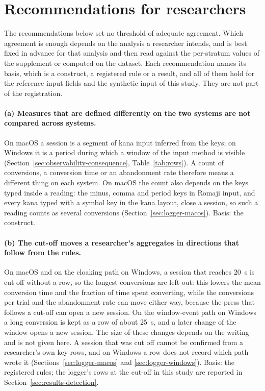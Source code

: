 
\section{Recommendations for researchers}
\label{sec:recommendations}

The recommendations below set no threshold of adequate agreement. Which agreement is enough depends on the analysis a
researcher intends, and is best fixed in advance for that analysis and then read against the per-stratum values of the
supplement or computed on the dataset. Each recommendation names its basis, which is a construct, a registered rule or
a result, and all of them hold for the reference input fields and the synthetic input of this study. They are not part
of the registration.

\paragraph{(a) Measures that are defined differently on the two systems are not compared across systems.} On macOS a
session is a segment of kana input inferred from the keys; on Windows it is a period during which a window of the input
method is visible (Section~\ref{sec:observability-consequence}, Table~\ref{tab:rows}). A count of conversions, a
conversion time or an abandonment rate therefore means a different thing on each system. On macOS the count also depends
on the keys typed inside a reading: the minus, comma and period keys in Romaji input, and every kana typed with a symbol
key in the kana layout, close a session, so such a reading counts as several conversions
(Section~\ref{sec:logger-macos}). Basis: the construct.

\paragraph{(b) The cut-off moves a researcher's aggregates in directions that follow from the rules.} On macOS and on
the cloaking path on Windows, a session that reaches 20~s is cut off without a row, so the longest conversions are
left out: this lowers the mean conversion time and the fraction of time spent converting, while the conversions per
trial and the abandonment rate can move either way, because the press that follows a cut-off can open a new session. On
the window-event path on Windows a long conversion is kept as a row of about 25~s, and a later change of the window
opens a new session. The size of these changes depends on the writing and is not given here. A session that was cut
off cannot be confirmed from a researcher's own key rows, and on Windows a row does not record which path wrote it
(Sections~\ref{sec:logger-macos} and \ref{sec:logger-windows}). Basis: the registered rules; the logger's rows at the
cut-off in this study are reported in Section~\ref{sec:results-detection}.

